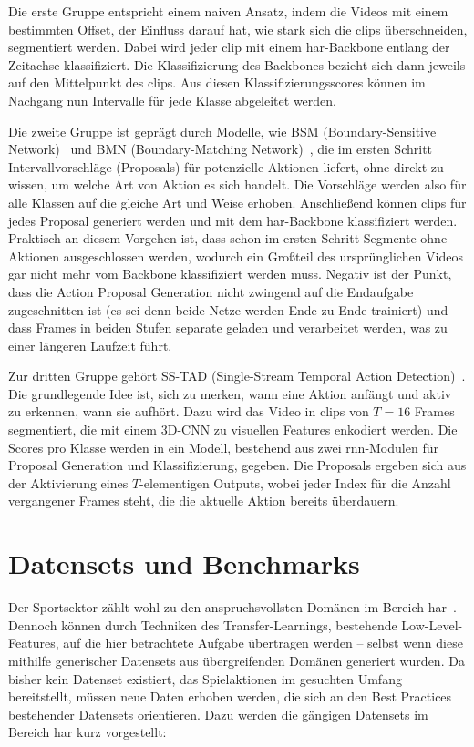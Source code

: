 Die erste Gruppe entspricht einem naiven Ansatz, indem die Videos mit einem bestimmten Offset, der Einfluss darauf hat, wie stark sich die \glspl{clip} überschneiden, segmentiert werden.
Dabei wird jeder \gls{clip} mit einem \gls{har}-Backbone entlang der Zeitachse klassifiziert.
Die Klassifizierung des Backbones bezieht sich dann jeweils auf den Mittelpunkt des \glspl{clip}.
Aus diesen Klassifizierungsscores können im Nachgang nun Intervalle für jede Klasse abgeleitet werden.

Die zweite Gruppe ist geprägt durch Modelle, wie BSM (Boundary-Sensitive Network)~\cite{Lin18} und BMN (Boundary-Matching Network)~\cite{Lin19}, die im ersten Schritt Intervallvorschläge (Proposals) für potenzielle Aktionen liefert, ohne direkt zu wissen, um welche Art von Aktion es sich handelt.
Die Vorschläge werden also für alle Klassen auf die gleiche Art und Weise erhoben.
Anschließend können \glspl{clip} für jedes Proposal generiert werden und mit dem \gls{har}-Backbone klassifiziert werden.
Praktisch an diesem Vorgehen ist, dass schon im ersten Schritt Segmente ohne Aktionen ausgeschlossen werden, wodurch ein Großteil des ursprünglichen Videos gar nicht mehr vom Backbone klassifiziert werden muss.
Negativ ist der Punkt, dass die Action Proposal Generation nicht zwingend auf die Endaufgabe zugeschnitten ist (es sei denn beide Netze werden Ende-zu-Ende trainiert) und dass Frames in beiden Stufen separate geladen und verarbeitet werden, was zu einer längeren Laufzeit führt.

Zur dritten Gruppe gehört \ua SS-TAD (Single-Stream Temporal Action Detection)~\cite{Buch17}.
Die grundlegende Idee ist, sich zu merken, wann eine Aktion anfängt und aktiv zu erkennen, wann sie aufhört.
Dazu wird das Video in \glspl{clip} von $T=16$ Frames segmentiert, die mit einem 3D-CNN zu visuellen Features enkodiert werden.
Die Scores pro Klasse werden in ein Modell, bestehend aus zwei \gls{rnn}-Modulen für Proposal Generation und Klassifizierung, gegeben.
Die Proposals ergeben sich aus der Aktivierung eines $T$-elementigen Outputs, wobei jeder Index für die Anzahl vergangener Frames steht, die die aktuelle Aktion bereits überdauern.

\section{Datensets und Benchmarks}
\label{sec:datensets-und-benchmarks}

Der Sportsektor zählt wohl zu den anspruchsvollsten Domänen im Bereich \gls{har}~\cite{Sozykin17}.
Dennoch können durch Techniken des Transfer-Learnings, bestehende Low-Level-Features, auf die hier betrachtete Aufgabe übertragen werden -- selbst wenn diese mithilfe generischer Datensets aus übergreifenden Domänen generiert wurden.
Da bisher kein Datenset existiert, das Spielaktionen im gesuchten Umfang bereitstellt, müssen neue Daten erhoben werden, die sich an den Best Practices bestehender Datensets orientieren.
Dazu werden die gängigen Datensets im Bereich \gls{har} kurz vorgestellt:

